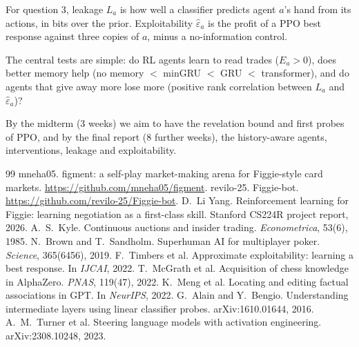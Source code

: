 \documentclass{article}
\begin{document}
For question 3, leakage $L_a$ is how well a classifier predicts agent $a$'s hand from its actions, in bits over the prior. Exploitability $\hat\varepsilon_a$ is the profit of a PPO best response against three copies of $a$, minus a no-information control.

The central tests are simple: do RL agents learn to read trades ($E_a>0$), does better memory help (no memory $<$ minGRU $<$ GRU $<$ transformer), and do agents that give away more lose more (positive rank correlation between $L_a$ and $\hat\varepsilon_a$)?

By the midterm (3 weeks) we aim to have the revelation bound and first probes of PPO, and by the final report (8 further weeks), the history-aware agents, interventions, leakage and exploitability.

{\footnotesize
\begin{thebibliography}{99}\setlength{\itemsep}{0pt}\setlength{\parskip}{0pt}
 mneha05. \newblock figment: a self-play market-making arena for Figgie-style card markets. \newblock \url{https://github.com/mneha05/figment}.
 revilo-25. \newblock Figgie-bot. \newblock \url{https://github.com/revilo-25/Figgie-bot}.
 D.~Li Yang. \newblock Reinforcement learning for Figgie: learning negotiation as a first-class skill. \newblock Stanford CS224R project report, 2026.
 A.~S.~Kyle. \newblock Continuous auctions and insider trading. \newblock \emph{Econometrica}, 53(6), 1985.
 N.~Brown and T.~Sandholm. \newblock Superhuman AI for multiplayer poker. \newblock \emph{Science}, 365(6456), 2019.
 F.~Timbers et al. \newblock Approximate exploitability: learning a best response. \newblock In \emph{IJCAI}, 2022.
 T.~McGrath et al. \newblock Acquisition of chess knowledge in AlphaZero. \newblock \emph{PNAS}, 119(47), 2022.
 K.~Meng et al. \newblock Locating and editing factual associations in GPT. \newblock In \emph{NeurIPS}, 2022.
 G.~Alain and Y.~Bengio. \newblock Understanding intermediate layers using linear classifier probes. \newblock arXiv:1610.01644, 2016.
 A.~M.~Turner et al. \newblock Steering language models with activation engineering. \newblock arXiv:2308.10248, 2023.
\end{thebibliography}
}
\end{document}
